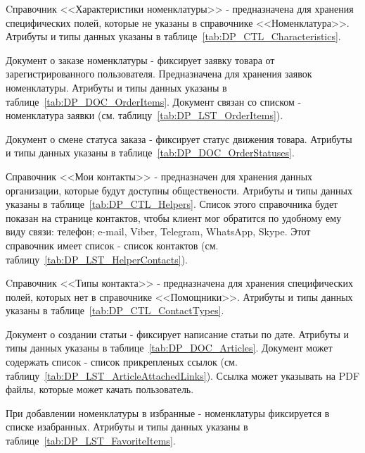 Cправочник <<Характеристики номенклатуры>> - предназначена для хранения специфических полей, которые не указаны в справочнике <<Номенклатура>>.
Атрибуты и типы данных указаны в таблице~\ref{tab:DP_CTL_Characteristics}.

Документ о заказе номенклатуры - фиксирует заявку товара от зарегистрированного пользователя.
Предназначена для хранения заявок номенклатуры.
Атрибуты и типы данных указаны в таблице~\ref{tab:DP_DOC_OrderItems}.
Документ связан со списком - номенклатура заявки (см. таблицу~\ref{tab:DP_LST_OrderItems}).

Документ о смене статуса заказа - фиксирует статус движения товара.
Атрибуты и типы данных указаны в таблице~\ref{tab:DP_DOC_OrderStatuses}.

Справочник <<Мои контакты>> - предназначен для хранения данных организации, которые будут доступны обществености.
Атрибуты и типы данных указаны в таблице~\ref{tab:DP_CTL_Helpers}.
Список этого справочника будет показан на странице контактов,
чтобы клиент мог обратится по удобному ему виду связи:
телефон; e-mail, Viber, Telegram, WhatsApp, Skype.
Этот справочник имеет список - список контактов (см. таблицу~\ref{tab:DP_LST_HelperContacts}).

Cправочник <<Типы контакта>> - предназначена для хранения специфических полей, которых нет в справочнике <<Помощники>>.
Атрибуты и типы данных указаны в таблице~\ref{tab:DP_CTL_ContactTypes}.

Документ о создании статьи - фиксирует написание статьи по дате.
Атрибуты и типы данных указаны в таблице~\ref{tab:DP_DOC_Articles}.
Документ может содержать список - список прикрепленых ссылок (см. таблицу~\ref{tab:DP_LST_ArticleAttachedLinks}).
Ссылка может указывать на PDF файлы, которые может качать пользователь.

При добавлении номенклатуры в избранные - номенклатуры фиксируется в списке изабранных.
Атрибуты и типы данных указаны в таблице~\ref{tab:DP_LST_FavoriteItems}.

